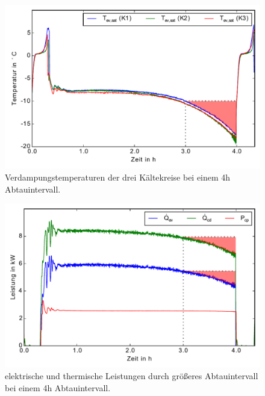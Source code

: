 \begin{figure}[h!]
\centering
\includegraphics[scale=0.8]{Pictures/50evaploss.pdf}
\caption{Verdampungstemperaturen der drei Kältekreise bei einem 4h Abtauintervall.}
\label{fig:SinkenVerdampfung4h3h}
\end{figure}

\begin{figure}[h!]
\centering
\includegraphics[scale=0.8]{Pictures/50powerloss.pdf}
\caption{elektrische und thermische Leistungen durch größeres Abtauintervall bei einem 4h Abtauintervall.}
\label{fig:Leistungsverlust4h3h}
\end{figure}


